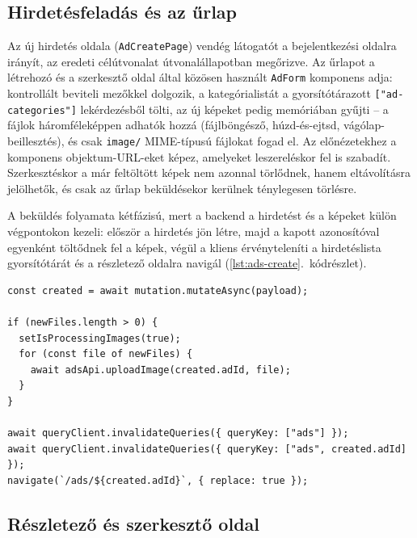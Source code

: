 \subsection{Hirdetésfeladás és az űrlap}

Az új hirdetés oldala (\texttt{AdCreatePage}) vendég látogatót a bejelentkezési oldalra irányít,
az eredeti célútvonalat útvonalállapotban megőrizve. Az űrlapot a létrehozó és a szerkesztő oldal
által közösen használt \texttt{AdForm} komponens adja: kontrollált beviteli mezőkkel dolgozik, a
kategórialistát a gyorsítótárazott \texttt{["ad-categories"]} lekérdezésből tölti, az új képeket
pedig memóriában gyűjti -- a fájlok háromféleképpen adhatók hozzá (fájlböngésző, húzd-és-ejtsd,
vágólap-beillesztés), és csak \texttt{image/} MIME-típusú fájlokat fogad el. Az előnézetekhez a
komponens objektum-URL-eket képez, amelyeket leszereléskor fel is szabadít. Szerkesztéskor a már
feltöltött képek nem azonnal törlődnek, hanem eltávolításra jelölhetők, és csak az űrlap
beküldésekor kerülnek ténylegesen törlésre.

A beküldés folyamata kétfázisú, mert a backend a hirdetést és a képeket külön végpontokon
kezeli: először a hirdetés jön létre, majd a kapott azonosítóval egyenként töltődnek fel a képek,
végül a kliens érvényteleníti a hirdetéslista gyorsítótárát és a részletező oldalra navigál
(\ref{lst:ads-create}.~kódrészlet).

\begin{lstlisting}[caption={A hirdetésfeladás kétfázisú beküldése az \texttt{AdCreatePage} komponensben (kivonat)}, label={lst:ads-create}]
const created = await mutation.mutateAsync(payload);

if (newFiles.length > 0) {
  setIsProcessingImages(true);
  for (const file of newFiles) {
    await adsApi.uploadImage(created.adId, file);
  }
}

await queryClient.invalidateQueries({ queryKey: ["ads"] });
await queryClient.invalidateQueries({ queryKey: ["ads", created.adId] });
navigate(`/ads/${created.adId}`, { replace: true });
\end{lstlisting}

\subsection{Részletező és szerkesztő oldal}

